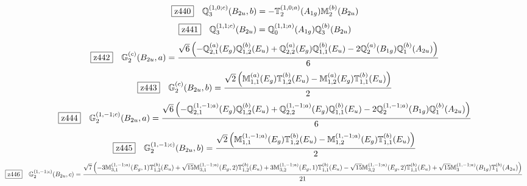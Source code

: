 \documentclass[fleqn,10pt,landscape]{jsarticle}
\begin{document}
\begin{dmath*}
\hspace*{3mm}\fbox{z440}\quad \mathbb{Q}_{3}^{(1,0;c)}(B_{2u},b)=- \mathbb{T}_{2}^{(1,0;a)}(A_{1g}) \mathbb{M}_{2}^{(b)}(B_{2u})
\end{dmath*}
\begin{dmath*}
\hspace*{3mm}\fbox{z441}\quad \mathbb{Q}_{3}^{(1,1;c)}(B_{2u})=\mathbb{Q}_{0}^{(1,1;a)}(A_{1g}) \mathbb{Q}_{3}^{(b)}(B_{2u})
\end{dmath*}
\begin{dmath*}
\hspace*{3mm}\fbox{z442}\quad \mathbb{G}_{2}^{(c)}(B_{2u},a)=\frac{\sqrt{6} \left(- \mathbb{Q}_{2,1}^{(a)}(E_{g}) \mathbb{Q}_{1,2}^{(b)}(E_{u}) + \mathbb{Q}_{2,2}^{(a)}(E_{g}) \mathbb{Q}_{1,1}^{(b)}(E_{u}) - 2 \mathbb{Q}_{2}^{(a)}(B_{1g}) \mathbb{Q}_{1}^{(b)}(A_{2u})\right)}{6}
\end{dmath*}
\begin{dmath*}
\hspace*{3mm}\fbox{z443}\quad \mathbb{G}_{2}^{(c)}(B_{2u},b)=\frac{\sqrt{2} \left(\mathbb{M}_{1,1}^{(a)}(E_{g}) \mathbb{T}_{1,2}^{(b)}(E_{u}) - \mathbb{M}_{1,2}^{(a)}(E_{g}) \mathbb{T}_{1,1}^{(b)}(E_{u})\right)}{2}
\end{dmath*}
\begin{dmath*}
\hspace*{3mm}\fbox{z444}\quad \mathbb{G}_{2}^{(1,-1;c)}(B_{2u},a)=\frac{\sqrt{6} \left(- \mathbb{Q}_{2,1}^{(1,-1;a)}(E_{g}) \mathbb{Q}_{1,2}^{(b)}(E_{u}) + \mathbb{Q}_{2,2}^{(1,-1;a)}(E_{g}) \mathbb{Q}_{1,1}^{(b)}(E_{u}) - 2 \mathbb{Q}_{2}^{(1,-1;a)}(B_{1g}) \mathbb{Q}_{1}^{(b)}(A_{2u})\right)}{6}
\end{dmath*}
\begin{dmath*}
\hspace*{3mm}\fbox{z445}\quad \mathbb{G}_{2}^{(1,-1;c)}(B_{2u},b)=\frac{\sqrt{2} \left(\mathbb{M}_{1,1}^{(1,-1;a)}(E_{g}) \mathbb{T}_{1,2}^{(b)}(E_{u}) - \mathbb{M}_{1,2}^{(1,-1;a)}(E_{g}) \mathbb{T}_{1,1}^{(b)}(E_{u})\right)}{2}
\end{dmath*}
\begin{dmath*}
\hspace*{3mm}\fbox{z446}\quad \mathbb{G}_{2}^{(1,-1;c)}(B_{2u},c)=\frac{\sqrt{7} \left(- 3 \mathbb{M}_{3,1}^{(1,-1;a)}(E_{g},1) \mathbb{T}_{1,2}^{(b)}(E_{u}) + \sqrt{15} \mathbb{M}_{3,1}^{(1,-1;a)}(E_{g},2) \mathbb{T}_{1,2}^{(b)}(E_{u}) + 3 \mathbb{M}_{3,2}^{(1,-1;a)}(E_{g},1) \mathbb{T}_{1,1}^{(b)}(E_{u}) - \sqrt{15} \mathbb{M}_{3,2}^{(1,-1;a)}(E_{g},2) \mathbb{T}_{1,1}^{(b)}(E_{u}) + \sqrt{15} \mathbb{M}_{3}^{(1,-1;a)}(B_{1g}) \mathbb{T}_{1}^{(b)}(A_{2u})\right)}{21}
\end{dmath*}
\end{document}
